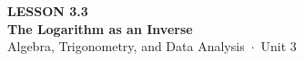 \documentclass[aspectratio=169, 11pt]{beamer}
\begin{document}
{
\begin{frame}[plain]
  \vspace{2.8cm}\hspace{0.55cm}%
  \begin{minipage}{0.9\textwidth}
    {\color{goldacc}\bfseries\small LESSON 3.3}\\[0.5cm]
    {\color{white}\bfseries\LARGE The Logarithm as an Inverse}\\[1.2cm]
    {\color{mistmid}\small Algebra, Trigonometry, and Data Analysis~$\cdot$~Unit 3}
  \end{minipage}
\end{frame}
}

\begin{frame}[t, plain]
\end{frame}
\end{document}
